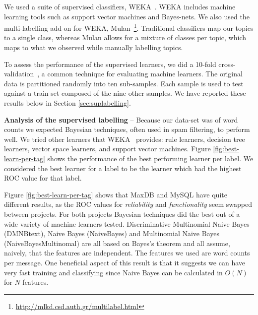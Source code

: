 \documentclass[]{sig-alternate}
\begin{document}
We used a suite of supervised classifiers, WEKA~\cite{weka09}. 
WEKA includes machine learning tools such as support vector machines and Bayes-nets. 
We also used the multi-labelling add-on for WEKA, Mulan~\cite{mulan}\footnote{\url{http://mlkd.csd.auth.gr/multilabel.html}}. 
Traditional classifiers map our topics to a single class, whereas Mulan allows for a mixture of classes per topic, which maps to what we observed while manually labelling topics.

To assess the performance of the supervised learners, we did a 10-fold cross-validation~\cite{Kohavi1995}, a common technique for evaluating machine learners. 
The original data is partitioned randomly into ten sub-samples. Each sample is used to test against a train set composed of the nine other samples.
We have reported these results below in Section \ref{sec:suplabelling}.

\textbf{Analysis of the supervised labelling} -- 
Because our data-set was of word counts we expected Bayesian techniques, often used in spam filtering, to perform well. 
We tried other learners that WEKA~\cite{weka09} provides: rule learners, decision tree learners, vector space learners, and support vector machines.  
Figure \ref{fig:best-learn-per-tag} shows the performance of the best performing learner per label. 
 We considered the best learner for a label to be the learner which had the highest ROC value for that label. 

Figure \ref{fig:best-learn-per-tag} shows that MaxDB and MySQL have quite different results, as the ROC values for \emph{reliability} and \emph{functionality} seem swapped between projects. 
For both projects Bayesian techniques did the best out of a wide variety of machine learners tested. 
Discriminative Multinomial Naive Bayes (DMNBtext), Naive Bayes (NaiveBayes) and Multinomial Naive Bayes (NaiveBayesMultinomal) are all based on Bayes's theorem and all assume, naively, that the features are independent. 
The features we used are word counts per message. 
One beneficial aspect of this result is that it suggests we can have very fast training and classifying  since Naive Bayes can be calculated in $O(N)$ for $N$ features.
\end{document}
